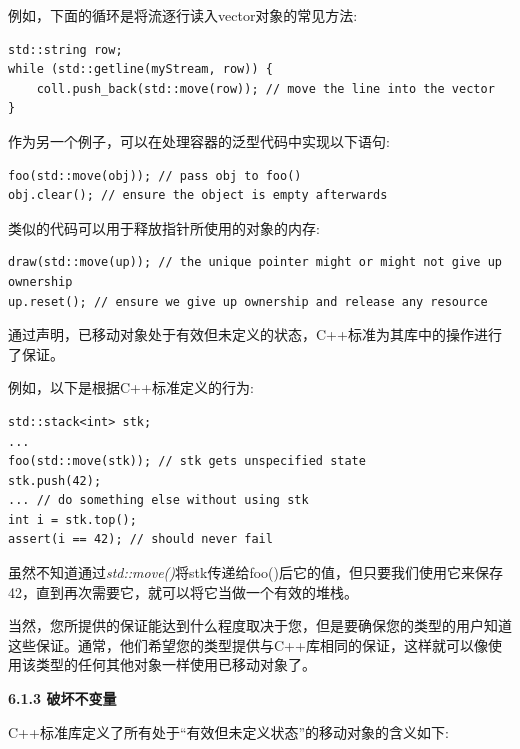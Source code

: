 例如，下面的循环是将流逐行读入vector对象的常见方法:\par

\begin{lstlisting}[caption={}]
std::string row;
while (std::getline(myStream, row)) {
	coll.push_back(std::move(row)); // move the line into the vector
}
\end{lstlisting}

作为另一个例子，可以在处理容器的泛型代码中实现以下语句:\par

\begin{lstlisting}[caption={}]
foo(std::move(obj)); // pass obj to foo()
obj.clear(); // ensure the object is empty afterwards
\end{lstlisting}

类似的代码可以用于释放指针所使用的对象的内存:\par

\begin{lstlisting}[caption={}]
draw(std::move(up)); // the unique pointer might or might not give up ownership
up.reset(); // ensure we give up ownership and release any resource
\end{lstlisting}

通过声明，已移动对象处于有效但未定义的状态，C++标准为其库中的操作进行了保证。\par

例如，以下是根据C++标准定义的行为:\par

\begin{lstlisting}[caption={}]
std::stack<int> stk;
...
foo(std::move(stk)); // stk gets unspecified state
stk.push(42);
... // do something else without using stk
int i = stk.top();
assert(i == 42); // should never fail
\end{lstlisting}

虽然不知道通过\textit{std::move()}将stk传递给foo()后它的值，但只要我们使用它来保存42，直到再次需要它，就可以将它当做一个有效的堆栈。\par

当然，您所提供的保证能达到什么程度取决于您，但是要确保您的类型的用户知道这些保证。通常，他们希望您的类型提供与C++库相同的保证，这样就可以像使用该类型的任何其他对象一样使用已移动对象了。\par

\hspace*{\fill} \par %
\textbf{6.1.3 破坏不变量}

C++标准库定义了所有处于“有效但未定义状态”的移动对象的含义如下:\par

